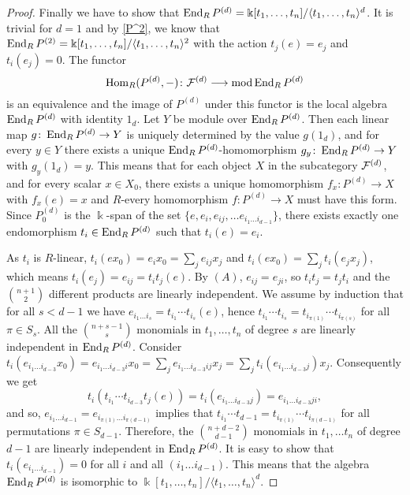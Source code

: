 \documentclass[10pt]{amsart}
\begin{document}
\begin{proof}
\noindent  Finally we have to show that $\operatorname{End}_RP^{(d)}=\Bbbk [t_1,\ldots ,t_n]/\langle t_1,\ldots ,t_n\rangle^d$.
It is trivial for $d=1$ and by \ref{P^2}, we know that 
$\operatorname{End}_RP^{(2)}=\Bbbk [t_1,\ldots ,t_n]/\langle t_1,\ldots ,t_n\rangle^2$ with the action $t_j(e) = e_j$ and
$t_i(e_j)=0$. 
The functor $$\operatorname{Hom}_R(P^{(d)},-)\colon\mathcal F^{(d)}\longrightarrow\operatorname{mod}\operatorname{End}_RP^{(d)}$$ is an equivalence
and the image of $P^{(d)}$ under this functor is the local algebra $\operatorname{End}_RP^{(d)}$ with identity $1_d$. Let $Y$ be module over $\operatorname{End}_RP^{(d)}$. Then each linear map $g\colon\operatorname{End}_RP^{(d)}\to Y$ is uniquely determined by the value $g(1_d)$, and for every $y\in Y$ there exists a unique $\operatorname{End}_RP^{(d)}$-homomorphism $g_y\colon\operatorname{End}_RP^{(d)}\to Y$ with
$g_y(1_d)=y$. This means that for each object $X$  in the subcategory $\mathcal F^{(d)}$, and for every
scalar $x\in X_0$, there exists a unique homomorphism $f_x\colon P^{(d)}\to X$ with $f_x(e)=x$ and $R$-every homomorphism
$f\colon P^{(d)} \to X$ must have this form. Since $P^{(d)}_0$ is the $\Bbbk$-span of the set
$\{e, e_i, e_{ij},\ldots e_{i_1\ldots i_{d-1}}\}$, there exists exactly one endomorphism $t_i\in\operatorname{End}_RP^{(d)}$
such that $t_i(e) = e_i$. 
\smallskip

\noindent As $t_i$ is $R$-linear, $t_i(ex_0) = e_ix_0=\sum_j e_{ij}x_j$ and
$t_i(ex_0) = \sum_jt_i(e_jx_j)$, which means $t_i(e_j)=e_{ij}=t_it_j(e)$. By $(A)$, $e_{ij}=e_{ji}$, so
$t_it_j = t_jt_i$ and the $\binom{n+1}{2}$ different products are linearly independent.
We assume by induction that for all $s<d-1$ we have $e_{i_1\ldots i_s} = t_{i_1}\cdots t_{i_s} (e)$,
hence $t_{i_1} \cdots t_{i_s} = t_{i_{\pi (1)}}\cdots t_{i_{\pi (s)}} $ for all $\pi\in S_s$. All the
$\binom{n+s-1}{s}$ monomials in $t_1,\ldots ,t_n$ of degree $s$ are linearly independent in $\operatorname{End}_RP^{(d)}$.
Consider  $t_i(e_{i_1\ldots i_{d-3}}x_0)= e_{i_1\ldots i_{d-3}i}x_0= \sum_je_{i_1\ldots  i_{d-3}ij}x_j
 =\sum_j t_i(e_{i_1\ldots i_{d-3}j})x_j$.
 Consequently we get $$t_i(t_{i_1}\cdots t_{i_{d-3}}t_j(e))=t_i(e_{i_1\ldots i_{d-3}j})= e_{i_1\ldots i_{d-3}ji},$$
 and so, $e_{i_1\ldots i_{d-1}} = e_{i_{\pi  (1)}\ldots i_{\pi (d-1)}}$ implies that $t_{i_1}\cdots t_{d-1}=t_{i_{\pi (1)}}\cdots t_{i_{\pi (d-1)}}$ for all permutations $\pi\in S_{d-1}$.
Therefore, the $\binom{n+d-2}{d-1}$ monomials
in $t_1,\ldots t_n$ of degree $d-1$ are linearly independent in $\operatorname{End}_RP^{(d)}$. It is easy to show that 
$t_i(e_{i_1\ldots i_{d-1}}) =0$ for all $i$ and all $(i_1\ldots i_{d-1})$. This means that the algebra
$\operatorname{End}_RP^{(d)}$ is isomorphic to $\Bbbk [t_1,\ldots ,t_n] /\langle t_1,\ldots ,t_n\rangle^d$.
\end{proof}
\end{document}
